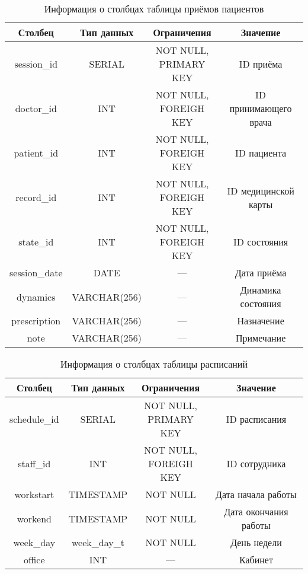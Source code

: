 \begin{table}[H]
\begin{center}
	\captionsetup{justification=raggedright,singlelinecheck=off,margin=5mm}
	\caption{Информация о столбцах таблицы приёмов пациентов}
	\begin{tabular}{| c | c | c | c |}
		\hline
		Столбец & Тип данных & Ограничения & Значение \\
		\hline
		session\_id & SERIAL & \makecell{NOT NULL, \\ PRIMARY KEY} & ID приёма \\
		\hline
		doctor\_id & INT & \makecell{NOT NULL, \\ FOREIGH KEY} & ID принимающего врача \\
		\hline
		patient\_id & INT &  \makecell{NOT NULL, \\ FOREIGH KEY} & ID пациента \\
		\hline
		record\_id &  INT &  \makecell{NOT NULL, \\ FOREIGH KEY} & ID медицинской карты \\
		\hline
		state\_id &  INT &  \makecell{NOT NULL, \\ FOREIGH KEY} & ID состояния\\
		\hline
		session\_date & DATE & --- & Дата приёма\\
		\hline
		dynamics & VARCHAR(256) & --- & Динамика состояния \\
		\hline
		prescription & VARCHAR(256) & --- & Назначение \\
		\hline
		note & VARCHAR(256) & --- & Примечание \\
		\hline
	\end{tabular}
	\label{table:sessions-columns}
\end{center}
\end{table}

\begin{table}[H]
\begin{center}
	\captionsetup{justification=raggedright,singlelinecheck=off,margin=5mm}
	\caption{Информация о столбцах таблицы расписаний}
	\begin{tabular}{| c | c | c | c |}
		\hline
		Столбец & Тип данных & Ограничения & Значение \\
		\hline
		schedule\_id & SERIAL & \makecell{NOT NULL, \\ PRIMARY KEY} & ID расписания \\
		\hline
		staff\_id & INT & \makecell{NOT NULL, \\ FOREIGH KEY} & ID сотрудника \\
		\hline
		workstart & TIMESTAMP & NOT NULL & Дата начала работы\\
		\hline
		workend & TIMESTAMP & NOT NULL & Дата окончания работы \\
		\hline
		week\_day & week\_day\_t & NOT NULL & День недели \\
		\hline
		office & INT  & --- & Кабинет \\
		\hline
	\end{tabular}
	\label{table:schedules-columns}
\end{center}
\end{table}

